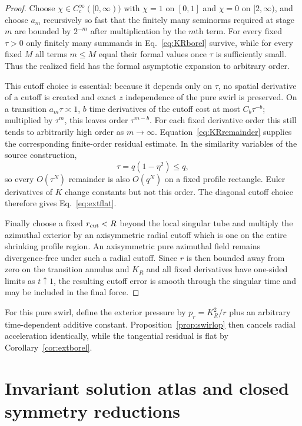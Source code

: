 \documentclass[aps,prd,reprint,superscriptaddress,nofootinbib,floatfix]{revtex4-2}
\theoremstyle{definition}
\theoremstyle{remark}
\begin{document}
\begin{proof}
	Choose $\chi\in C_c^\infty([0,\infty))$ with $\chi=1$ on $[0,1]$ and $\chi=0$ on $[2,\infty)$, and choose $a_m$ recursively so fast that the finitely many seminorms required at stage $m$ are bounded by $2^{-m}$ after multiplication by the $m$th term.  For every fixed $\tau>0$ only finitely many summands in Eq.~\eqref{eq:KRborel} survive, while for every fixed $M$ all terms $m\le M$ equal their formal values once $\tau$ is sufficiently small.  Thus the realized field has the formal asymptotic expansion to arbitrary order.

	This cutoff choice is essential: because it depends only on $\tau$, no spatial derivative of a cutoff is created and exact $z$ independence of the pure swirl is preserved.  On a transition $a_m\tau\asymp1$, $b$ time derivatives of the cutoff cost at most $C_b\tau^{-b}$; multiplied by $\tau^m$, this leaves order $\tau^{m-b}$.  For each fixed derivative order this still tends to arbitrarily high order as $m\to\infty$.  Equation~\eqref{eq:KRremainder} supplies the corresponding finite-order residual estimate.  In the similarity variables of the source construction,
	\begin{equation}
		\tau=q(1-\eta^2)\le q,
		\label{eq:tauleq}
	\end{equation}
	so every $O(\tau^N)$ remainder is also $O(q^N)$ on a fixed profile rectangle.  Euler derivatives of $K$ change constants but not this order.  The diagonal cutoff choice therefore gives Eq.~\eqref{eq:extflat}.

	Finally choose a fixed $r_{\rm cut}<R$ beyond the local singular tube and multiply the azimuthal exterior by an axisymmetric radial cutoff which is one on the entire shrinking profile region.  An axisymmetric pure azimuthal field remains divergence-free under such a radial cutoff.  Since $r$ is then bounded away from zero on the transition annulus and $K_R$ and all fixed derivatives have one-sided limits as $t\uparrow1$, the resulting cutoff error is smooth through the singular time and may be included in the final force.
\end{proof}

For this pure swirl, define the exterior pressure by $p_r=K_R^2/r$ plus an arbitrary time-dependent additive constant. Proposition~\ref{prop:swirlop} then cancels radial acceleration identically, while the tangential residual is flat by Corollary~\ref{cor:extborel}.



\section{Invariant solution atlas and closed symmetry reductions}\label{sec:invariantatlas}
\end{document}
